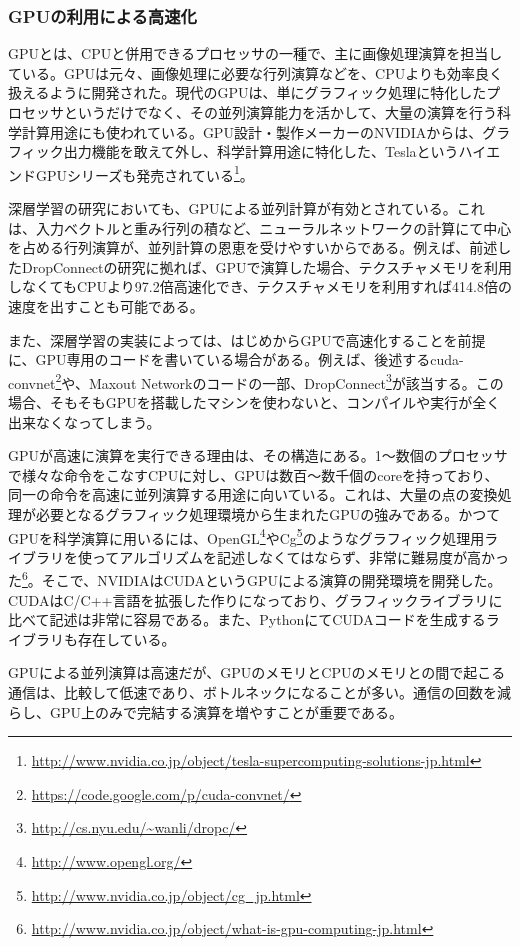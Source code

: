 \subsubsection{GPUの利用による高速化}
GPUとは、CPUと併用できるプロセッサの一種で、主に画像処理演算を担当している。GPUは元々、画像処理に必要な行列演算などを、CPUよりも効率良く扱えるように開発された。現代のGPUは、単にグラフィック処理に特化したプロセッサというだけでなく、その並列演算能力を活かして、大量の演算を行う科学計算用途にも使われている。GPU設計・製作メーカーのNVIDIAからは、グラフィック出力機能を敢えて外し、科学計算用途に特化した、TeslaというハイエンドGPUシリーズも発売されている\footnote{\url{http://www.nvidia.co.jp/object/tesla-supercomputing-solutions-jp.html}}。\par 
深層学習の研究においても、GPUによる並列計算が有効とされている。これは、入力ベクトルと重み行列の積など、ニューラルネットワークの計算にて中心を占める行列演算が、並列計算の恩恵を受けやすいからである\cite{bengio2012practical}。例えば、前述したDropConnectの研究\cite{wan2013regularization}に拠れば、GPUで演算した場合、テクスチャメモリを利用しなくてもCPUより97.2倍高速化でき、テクスチャメモリを利用すれば414.8倍の速度を出すことも可能である。\par
また、深層学習の実装によっては、はじめからGPUで高速化することを前提に、GPU専用のコードを書いている場合がある。例えば、後述するcuda-convnet\footnote{\url{https://code.google.com/p/cuda-convnet/}}や、Maxout Network\cite{goodfellow2013maxout}のコードの一部、DropConnect\cite{wan2013regularization}\footnote{\url{http://cs.nyu.edu/~wanli/dropc/}}が該当する。この場合、そもそもGPUを搭載したマシンを使わないと、コンパイルや実行が全く出来なくなってしまう。\par
GPUが高速に演算を実行できる理由は、その構造にある。1〜数個のプロセッサで様々な命令をこなすCPUに対し、GPUは数百〜数千個のcoreを持っており、同一の命令を高速に並列演算する用途に向いている。これは、大量の点の変換処理が必要となるグラフィック処理環境から生まれたGPUの強みである。かつてGPUを科学演算に用いるには、OpenGL\footnote{\url{http://www.opengl.org/}}やCg\footnote{\url{http://www.nvidia.co.jp/object/cg_jp.html}}のようなグラフィック処理用ライブラリを使ってアルゴリズムを記述しなくてはならず、非常に難易度が高かった\footnote{\url{http://www.nvidia.co.jp/object/what-is-gpu-computing-jp.html}}。そこで、NVIDIAはCUDAというGPUによる演算の開発環境を開発した\cite{garland2008parallel}。CUDAはC/C++言語を拡張した作りになっており、グラフィックライブラリに比べて記述は非常に容易である。また、PythonにてCUDAコードを生成するライブラリも存在している\cite{kloeckner2009pycuda:}\cite{klockner2012pycuda}。\par
GPUによる並列演算は高速だが、GPUのメモリとCPUのメモリとの間で起こる通信は、比較して低速であり、ボトルネックになることが多い。通信の回数を減らし、GPU上のみで完結する演算を増やすことが重要である\cite{bengio2012practical}。


